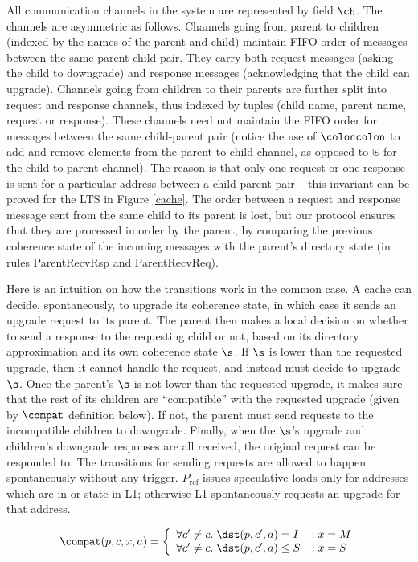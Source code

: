 All communication channels in the system are represented by field $\ch$.  The
channels are asymmetric as follows. Channels going from parent to children
(indexed by the names of the parent and child) maintain FIFO order of messages
between the same parent-child pair. They carry both request messages (asking
the child to downgrade) and response messages (acknowledging that the child can
upgrade). Channels going from children to their parents are further split into
request and response channels, thus indexed by tuples (child name, parent name,
request or response).  These channels need not maintain the FIFO order for
messages between the same child-parent pair (notice the use of $\coloncolon$ to
add and remove elements from the parent to child channel, as opposed to
$\uplus$ for the child to parent channel). The reason is that only one request
or one response is sent for a particular address between a child-parent pair --
this invariant can be proved for the LTS in  Figure \ref{cache}. The order
between a request and response message sent from the same child to its parent
is lost, but our protocol ensures that they are processed in order by the parent, by
comparing the previous coherence state of the incoming messages with the
parent's directory state (in rules ParentRecvRsp
and ParentRecvReq).

Here is an intuition on how the transitions work in the common case.  A cache
can decide, spontaneously, to upgrade its coherence state, in which case it
sends an upgrade request to its parent. The parent then makes a local decision
on whether to send a response to the requesting child or not, based on its
directory approximation and its own coherence state $\s$. If $\s$ is lower than
the requested upgrade, then it cannot handle the request, and instead must
decide to upgrade $\s$.  Once the parent's $\s$ is not lower than the requested
upgrade, it makes sure that the rest of its children are ``compatible'' with
the requested upgrade (given by $\compat$ definition below).  If not, the
parent must send requests to the incompatible children to downgrade. Finally, when
the $\s$'s upgrade and children's downgrade responses are all received, the
original request can be responded to. The transitions for sending requests are
allowed to happen spontaneously without any trigger. $P_\text{ref}$ issues speculative
loads only for addresses which are in \Sh{} or \Mo{} state in L1; otherwise L1
spontaneously requests an upgrade for that address.

\begin{defn}
\begin{displaymath}
\compat(p, c, x, a) = \left\{
\begin{array}{ll}
\forall c' \neq c. \; \dst(p,c',a) = I &: x = M\\
\forall c' \neq c. \; \dst(p,c',a) \le S &: x = S\\
\end{array}
\right.
\end{displaymath}
\end{defn}

